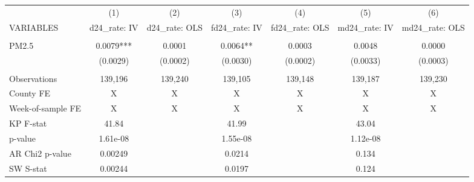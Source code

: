 \begin{tabular}{lcccccc} \hline
 & (1) & (2) & (3) & (4) & (5) & (6) \\
VARIABLES & d24\_rate: IV & d24\_rate: OLS & fd24\_rate: IV & fd24\_rate: OLS & md24\_rate: IV & md24\_rate: OLS \\ \hline
 &  &  &  &  &  &  \\
PM2.5 & 0.0079*** & 0.0001 & 0.0064** & 0.0003 & 0.0048 & 0.0000 \\
 & (0.0029) & (0.0002) & (0.0030) & (0.0002) & (0.0033) & (0.0003) \\
 &  &  &  &  &  &  \\
Observations & 139,196 & 139,240 & 139,105 & 139,148 & 139,187 & 139,230 \\
County FE & X & X & X & X & X & X \\
Week-of-sample FE & X & X & X & X & X & X \\
KP F-stat & 41.84 &  & 41.99 &  & 43.04 &  \\
p-value & 1.61e-08 &  & 1.55e-08 &  & 1.12e-08 &  \\
AR Chi2 p-value & 0.00249 &  & 0.0214 &  & 0.134 &  \\
 SW S-stat & 0.00244 &  & 0.0197 &  & 0.124 &  \\ \hline
\end{tabular}
